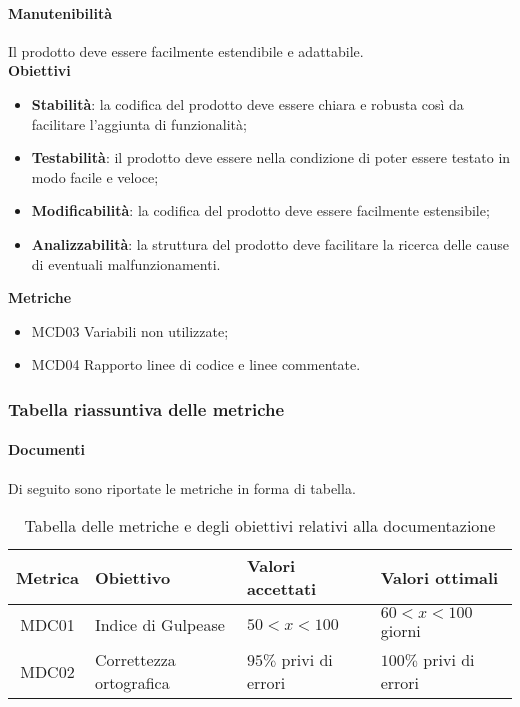 \paragraph{Manutenibilità}

Il prodotto deve essere facilmente estendibile e adattabile. \\

\textbf{Obiettivi}
\begin{itemize}
\item \textbf{Stabilità}: la codifica del prodotto deve essere chiara e robusta così da facilitare l'aggiunta di funzionalità;
\item \textbf{Testabilità}: il prodotto deve essere nella condizione di poter essere testato in modo facile e veloce;
\item \textbf{Modificabilità}: la codifica del prodotto deve essere facilmente estensibile;
\item \textbf{Analizzabilità}: la struttura del prodotto deve facilitare la ricerca delle cause di eventuali malfunzionamenti.
\end{itemize}

\textbf{Metriche}
\begin{itemize}
\item MCD03 Variabili non utilizzate;
\item MCD04 Rapporto linee di codice e linee commentate.
\end{itemize}

\subsubsection{Tabella riassuntiva delle metriche}
\paragraph{Documenti}
Di seguito sono riportate le metriche in forma di tabella.
\begin{table}[H]
		\begin{center}
			\setlength{\aboverulesep}{0pt}
			\setlength{\belowrulesep}{0pt}
			\setlength{\extrarowheight}{.75ex}
			\begin{tabular}{ c C{6cm} C{3cm} C{3cm} }
				\textbf{Metrica} & \textbf{Obiettivo} & \textbf{Valori accettati} & \textbf{Valori ottimali}  \\
				\toprule
				MDC01 & Indice di Gulpease & $ 50 < x < 100$ & $60 < x < 100$ giorni \\
				MDC02 & Correttezza ortografica & $ 95 \%$ privi di errori & $ 100\%$ privi di errori \\
				\bottomrule
			\end{tabular}
			\caption{Tabella delle metriche e degli obiettivi relativi alla documentazione}
		\end{center}
	\end{table}
	
